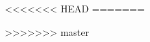 
<<<<<<< HEAD
=======

>>>>>>> master
\newcommand{\ESCOMPchSec}[1]{\rowcolor{colorAgua}\multicolumn{4}{|c|}{\bf #1}\\\hline}
\newcommand{\ESCOMPchItem}[2]{{\bf {#1}} & \multicolumn{3}{p{.66\textwidth}|}{#2}\\\hline}
\newcommand{\ESCOMPchSubItem}[3]{{\bf {#1}} & {#2} & \multicolumn{2}{p{.44\textwidth}|}{#3}\\\hline}
\newcommand{\ESCOMPchSubSubItem}[4]{{\bf {#1}} & {#2} & {#3}& {#4}\\\hline}

